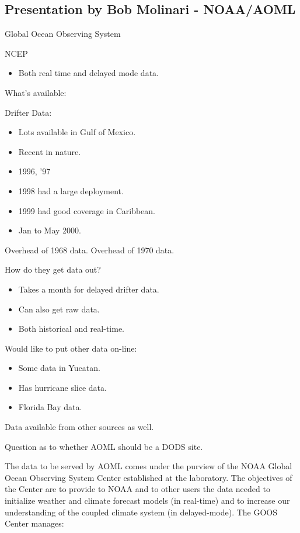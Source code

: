 \subsection{Presentation by Bob Molinari - NOAA/AOML}

Global Ocean Observing System

NCEP
\begin{itemize}
\item Both real time and delayed mode data.
\end{itemize}

What's available:

Drifter Data:
\begin{itemize}
\item      Lots available in Gulf of Mexico.
\item Recent in nature.
\item 1996, '97
\item 1998 had a large deployment.
\item 1999 had good coverage in Caribbean.
\item Jan to May 2000.
\end{itemize}

Overhead of 1968 data.
Overhead of 1970 data.

How do they get data out?
\begin{itemize}
\item      Takes a month for delayed drifter data.
\item Can also get raw data.
\item Both historical and real-time.
\end{itemize}

Would like to put other data on-line:
\begin{itemize}
\item Some data in Yucatan. 
\item Has hurricane slice data.
\item Florida Bay data.
\end{itemize}

Data available from other sources as well.

Question as to whether AOML should be a DODS site.

The data to be served by AOML comes under the purview of the NOAA Global Ocean 
Observing System Center established at the laboratory. The objectives of the Center are to 
provide to NOAA and to other users the data needed to initialize weather and climate forecast 
models (in real-time) and to increase our understanding of the coupled climate system (in 
delayed-mode).  The GOOS Center manages:

